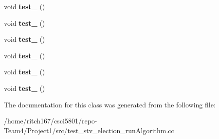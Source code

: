 \begin{DoxyCompactItemize}
$$void {\bfseries test\+\_} ()
\item 
\mbox{\label{classTest__STVElection__runAlgorithm_ad82fede51068a7024996bc004e138372}} 
void {\bfseries test\+\_} ()
\item 
\mbox{\label{classTest__STVElection__runAlgorithm_aa79fb71a3b04669824c41cd4547ec289}} 
void {\bfseries test\+\_} ()
\item 
\mbox{\label{classTest__STVElection__runAlgorithm_a2517f457e28e83643b9776660b3ed7b7}} 
void {\bfseries test\+\_} ()
\item 
\mbox{\label{classTest__STVElection__runAlgorithm_a3793df827ba08a755b2e402c46ae46c3}} 
void {\bfseries test\+\_} ()
\item 
\mbox{\label{classTest__STVElection__runAlgorithm_a6f158028cdcac64782fc287702da8c54}} 
void {\bfseries test\+\_} ()
\end{DoxyCompactItemize}


The documentation for this class was generated from the following file\+:\begin{DoxyCompactItemize}
\item 
/home/ritch167/csci5801/repo-\/\+Team4/\+Project1/src/test\+\_\+stv\+\_\+election\+\_\+run\+Algorithm.\+cc\end{DoxyCompactItemize}
